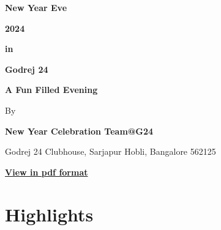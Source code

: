 \documentclass[makeidx, 11pt, oneside, onecolumn, openright, final, svgnames, dvipsnames, extrafontsizes]{memoir}
\begin{document}
\begin{center}

{\Huge \bfseries New Year Eve}

\vspace{3mm}

{\Huge \bfseries 2024}

\vspace{0.15in}

{\huge \bfseries in}

\vspace{0.15in}

{\Huge \bfseries Godrej 24}

\vspace{1in}

{\huge \bfseries \calligra A Fun Filled Evening}


\vspace{0.8in}

{\LARGE By}

\vspace{5mm}

{\Large \bfseries New Year Celebration Team@G24}




\vspace{2in}


{\calligra Godrej 24 Clubhouse, Sarjapur Hobli, Bangalore 562125}

\vspace{1in}

\textbf{\color{Fuchsia}\href{https://godrej-24.github.io/g24ny2024.pdf}{\large View in pdf format}}
\end{center}


\chapter*{Highlights}
\end{document}
